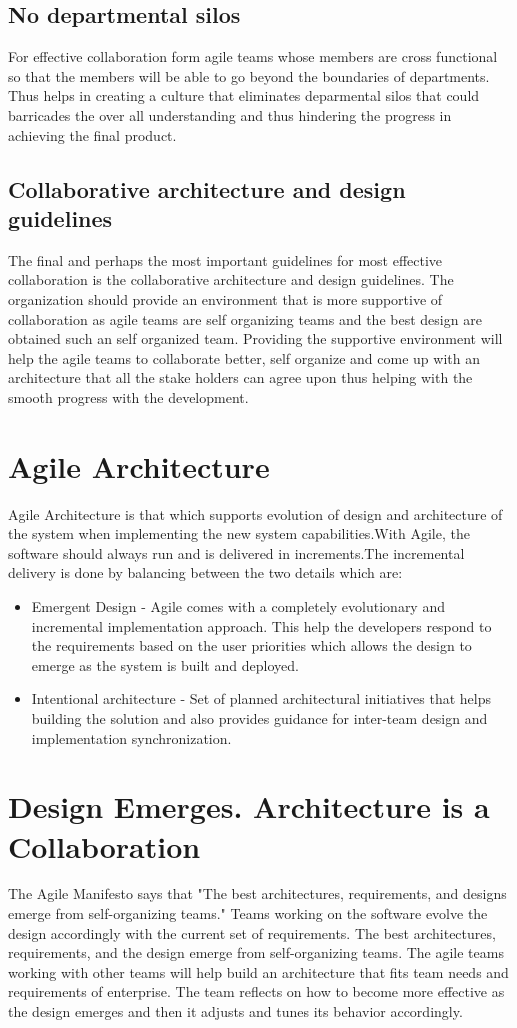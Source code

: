 \documentclass[sigconf]{acmart}
\begin{document}
\subsection{No departmental silos}
For effective collaboration form agile teams whose members are cross functional so that the members will be able to go beyond the boundaries of departments. Thus helps in creating a culture that eliminates deparmental silos that could barricades the over all understanding and thus hindering the progress in achieving the final product.

\subsection {Collaborative architecture and design guidelines}
The final and perhaps the most important guidelines for most effective collaboration is the collaborative architecture and design guidelines. The organization should provide an environment that is more supportive of collaboration as agile teams are self organizing teams and the best design are obtained such an self organized team. Providing the supportive environment will help the agile teams to collaborate better, self organize and come up with an architecture that all the stake holders can agree upon thus helping with the smooth progress with the development.

\section{Agile Architecture}
Agile Architecture is that which supports evolution of design and architecture of the system when implementing the new system capabilities.With Agile, the software should always run and is delivered in increments.The incremental delivery is done by balancing between the two details which are:
\begin{itemize}
  \item Emergent Design - Agile comes with a completely evolutionary and incremental implementation approach. This help the developers respond to the requirements based on the user priorities which allows the design to emerge as the system is built and deployed. 
  \item Intentional architecture - Set of planned architectural initiatives that helps building the solution and also provides guidance for inter-team design and implementation synchronization.
\end{itemize}

\section{Design Emerges. Architecture is a Collaboration}
The Agile Manifesto says that "The best architectures, requirements, and designs emerge from self-organizing teams." Teams working on the software evolve the design accordingly with the current set of requirements. The best architectures, requirements, and the design emerge from self-organizing teams. The agile teams working with other teams will help build an architecture that fits team needs and requirements of enterprise. The team reflects on how to become more effective as the design emerges and then it adjusts and tunes its behavior accordingly.
\end{document}
